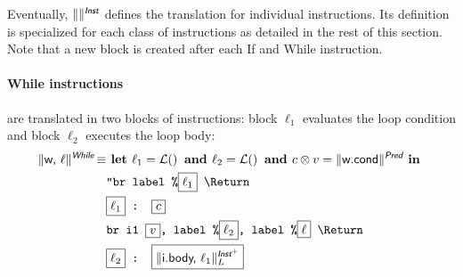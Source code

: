 \documentclass{llncs}
\newcommand{\trad}[2]{\ensuremath{\lVert \textsf{#1} \rVert^{\textit{#2}}}}
\newcommand{\nl}[0]{\text{\Return}}
\DeclareMathOperator{\isdef}{\equiv}
\DeclareMathOperator{\lbl}{\mathcal{L}()}
\newcommand{\llvm}[1]{\texttt{#1}}
\newcommand{\B}[1]{\textsf{#1}}
\newcommand{\ListOf}[1]{$\mbox{#1}^+$}
\newcommand{\LET}[0]{\textbf{ let }}
\newcommand{\IN}[0]{\textbf{ in }}
\newcommand{\AND}[0]{\textbf{ and }}
\newcommand{\PH}[1]{\framebox{$#1$}}
\newcommand{\sep}[0]{\otimes}
\begin{document}
Eventually, $\trad{}{\B{Inst}}$ defines the translation for individual
instructions. Its definition is specialized for each class of instructions as
detailed in the rest of this section. Note that a new block is created after
each \B{If} and \B{While} instruction.

\paragraph{While instructions} are translated in two blocks of instructions:
block $\ell_1$ evaluates the loop condition and block $\ell_2$ executes the loop
body:
\begin{align*}
\begin{split}
\trad{w, $\ell$}{\B{While}} \isdef 
  & \LET \ell_1 = \lbl \AND \ell_2 = \lbl \AND c \sep v = \trad{w.cond}{\B{Pred}} \IN \\
  & \llvm{"br label \%\PH{\ell_1} \nl} \\
  & \llvm{\PH{\ell_1} : \PH{c}} \\
  & \llvm{br i1 \PH{v}, label \%\PH{\ell_2}, label \%\PH{\ell} \nl} \\
  & \llvm{\PH{\ell_2} : \PH{\trad{i.body, $\ell_1$}{\ListOf{\B{Inst}}}_L}}
\end{split}
\end{align*}
\end{document}

